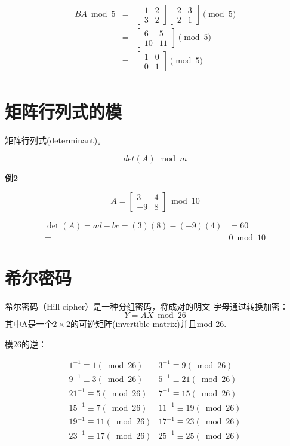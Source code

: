 \documentclass{article}
\begin{document}
\begin{eqnarray}   
\label{eq}
BA \bmod 5&=& \left[\begin{array}{ll}
1 & 2 \\
3 & 2
\end{array}\right]\left[\begin{array}{ll}
2 & 3 \\
2 & 1
\end{array}\right] \pmod{5} \nonumber \\ 
&=& \left[\begin{array}{ll}
6 & 5 \\
10 & 11
\end{array}\right] \pmod{5} \nonumber \\ 
&=& \left[\begin{array}{ll}
1 & 0 \\
0 & 1
\end{array}\right]  \pmod{5} \nonumber \\ 
\nonumber 
\end{eqnarray}

\clearpage

\section{矩阵行列式的模}
矩阵行列式(determinant)。

$$det(A) \bmod m$$

\textbf{例2}

$$
A=\left[\begin{array}{cc}
3 & 4 \\
-9 & 8
\end{array}\right]  \bmod 10
$$

$$
\begin{aligned}
\operatorname{det}(A)=a d-b c=(3)(8)-(-9)(4) &=60 \\
=& 0 \bmod 10
\end{aligned}
$$

\section{希尔密码}
希尔密码（Hill cipher）是一种分组密码，将成对的明文
字母通过转换加密：
$$Y=AX \bmod 26$$其中A是一个$2 \times 2$的可逆矩阵(invertible matrix)并且mod 26.

模26的逆：

$$
\begin{array}{cc}
 {1^{-1} \equiv 1(\bmod 26)} & 3^{-1} \equiv 9(\bmod 26) \\
 9^{-1} \equiv 3(\bmod 26) & 5^{-1} \equiv 21(\bmod 26) \\ 
 21^{-1} \equiv 5(\bmod 26) & 7^{-1} \equiv 15(\bmod 26) \\ 
 15^{-1} \equiv 7(\bmod 26) & 11^{-1} \equiv 19(\bmod 26) \\
 19^{-1} \equiv 11(\bmod 26) & 17^{-1} \equiv 23(\bmod 26)\\
 23^{-1} \equiv 17(\bmod 26) & 25^{-1} \equiv 25(\bmod 26)\\
\end{array}
$$
\end{document}
